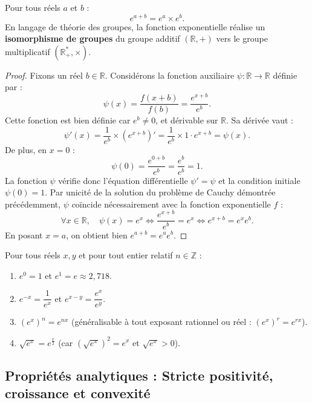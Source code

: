 \documentclass[11pt,a4paper]{article}
\newcommand{\Z}{\mathbb{Z}}
\newcommand{\R}{\mathbb{R}}
\begin{document}
\begin{theoremebox}
Pour tous réels $a$ et $b$ :
\[
e^{a+b} = e^a \times e^b.
\]
En langage de théorie des groupes, la fonction exponentielle réalise un \textbf{isomorphisme de groupes} du groupe additif $(\R, +)$ vers le groupe multiplicatif $(\R^*_+, \times)$.
\end{theoremebox}

\begin{proof}
Fixons un réel $b \in \R$. Considérons la fonction auxiliaire $\psi : \R \to \R$ définie par :
\[
\psi(x) = \frac{f(x+b)}{f(b)} = \frac{e^{x+b}}{e^b}.
\]
Cette fonction est bien définie car $e^b \neq 0$, et dérivable sur $\R$. Sa dérivée vaut :
\[
\psi'(x) = \frac{1}{e^b} \times (e^{x+b})' = \frac{1}{e^b} \times 1 \cdot e^{x+b} = \psi(x).
\]
De plus, en $x = 0$ :
\[
\psi(0) = \frac{e^{0+b}}{e^b} = \frac{e^b}{e^b} = 1.
\]
La fonction $\psi$ vérifie donc l'équation différentielle $\psi' = \psi$ et la condition initiale $\psi(0) = 1$. Par unicité de la solution du problème de Cauchy démontrée précédemment, $\psi$ coïncide nécessairement avec la fonction exponentielle $f$ :
\[
\forall x \in \R, \quad \psi(x) = e^x \iff \frac{e^{x+b}}{e^b} = e^x \iff e^{x+b} = e^x e^b.
\]
En posant $x = a$, on obtient bien $e^{a+b} = e^a e^b$.
\end{proof}

\begin{methodebox}
Pour tous réels $x, y$ et pour tout entier relatif $n \in \Z$ :
\begin{enumerate}[label=\textbf{\arabic*.}]
    \item $e^0 = 1$ \quad et \quad $e^1 = e \approx 2{,}718$.
    \item $e^{-x} = \dfrac{1}{e^x}$ \quad et \quad $e^{x-y} = \dfrac{e^x}{e^y}$.
    \item $(e^x)^n = e^{nx}$ \quad (généralisable à tout exposant rationnel ou réel : $(e^x)^r = e^{rx}$).
    \item $\sqrt{e^x} = e^{\frac{x}{2}}$ \quad (car $(\sqrt{e^x})^2 = e^x$ et $\sqrt{e^x} > 0$).
\end{enumerate}
\end{methodebox}

\subsection{Propriétés analytiques : Stricte positivité, croissance et convexité}
\end{document}
